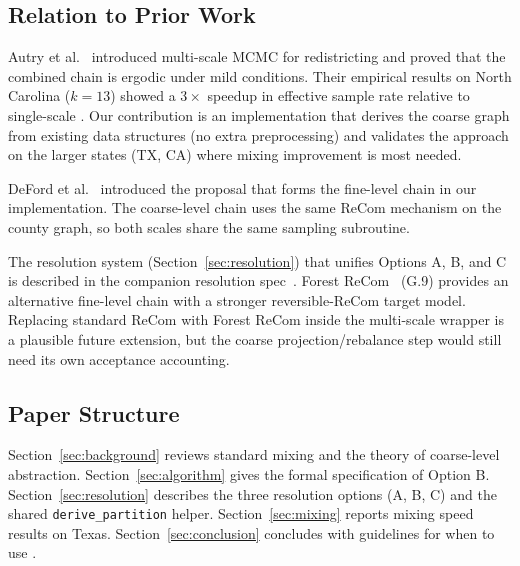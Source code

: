 \subsection{Relation to Prior Work}

Autry et al.~\citep{autry2021} introduced multi-scale MCMC for redistricting
and proved that the combined chain is ergodic under mild conditions.
Their empirical results on North Carolina ($k = 13$) showed a $3\times$
speedup in effective sample rate relative to single-scale \recom{}.
Our contribution is an implementation that derives the coarse graph from
existing data structures (no extra preprocessing) and validates the approach
on the larger states (TX, CA) where mixing improvement is most needed.

DeFord et al.~\citep{deford2021} introduced the \recom{} proposal that forms
the fine-level chain in our implementation.
The coarse-level chain uses the same ReCom mechanism on the county graph,
so both scales share the same sampling subroutine.

The resolution system (Section~\ref{sec:resolution}) that unifies Options A,
B, and C is described in the companion resolution spec~\citep{dellaLibera2026resolution}.
Forest ReCom~\citep{dellaLibera2026forestRecom} (G.9) provides an alternative
fine-level chain with a stronger reversible-ReCom target model. Replacing
standard ReCom with Forest ReCom inside the multi-scale wrapper is a plausible
future extension, but the coarse projection/rebalance step would still need its
own acceptance accounting.

\subsection{Paper Structure}

Section~\ref{sec:background} reviews standard \recom{} mixing and the
theory of coarse-level abstraction.
Section~\ref{sec:algorithm} gives the formal specification of \ms{} Option B.
Section~\ref{sec:resolution} describes the three resolution options (A, B, C)
and the shared \texttt{derive\_partition} helper.
Section~\ref{sec:mixing} reports mixing speed results on Texas.
Section~\ref{sec:conclusion} concludes with guidelines for when to use \ms{}.
